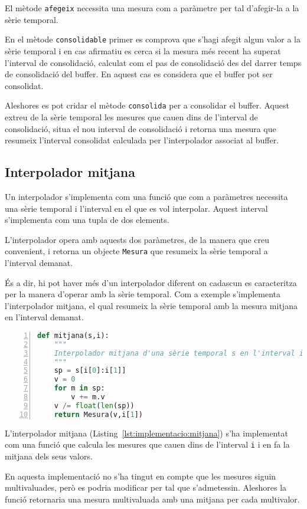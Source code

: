El mètode \verb+afegeix+ necessita una mesura com a paràmetre per tal d'afegir-la a la sèrie temporal.

En el mètode \verb+consolidable+ primer es comprova que s'hagi afegit algun valor a la sèrie temporal i en cas afirmatiu es cerca si la mesura més recent ha superat l'interval de consolidació, calculat com el pas de consolidació des del darrer temps de consolidació del buffer. En aquest cas es considera que el buffer pot ser consolidat.

Aleshores es pot cridar el mètode \verb+consolida+ per a consolidar el buffer. Aquest extreu de la sèrie temporal les mesures que cauen dins de l'interval de consolidació, situa el nou interval de consolidació i retorna una mesura que resumeix l'interval consolidat calculada per l'interpolador associat al buffer.


\subsection{Interpolador mitjana}

Un interpolador s'implementa com una funció que com a paràmetres necessita una sèrie temporal i l'interval en el que es vol interpolar. Aquest interval s'implementa com una tupla de dos elements. 

L'interpolador opera amb aquests dos paràmetres, de la manera que creu convenient, i retorna un objecte \verb+Mesura+ que resumeix la sèrie temporal a l'interval demanat.

És a dir, hi pot haver més d'un interpolador diferent on cadascun es caracteritza per la manera d'operar amb la sèrie temporal. Com a exemple s'implementa l'interpolador mitjana, el qual resumeix la sèrie temporal amb la mesura mitjana en l'interval demanat.

\begin{lstlisting}[float,language=Python,caption=Implementació de l'interpolador mitjana,label=lst:implementacio:mitjana,numbers=left]
def mitjana(s,i):
    """
    Interpolador mitjana d'una sèrie temporal s en l'interval i.
    """
    sp = s[i[0]:i[1]]
    v = 0
    for m in sp:
        v += m.v 
    v /= float(len(sp))
    return Mesura(v,i[1])
\end{lstlisting}

L'interpolador mitjana (Listing~\ref{lst:implementacio:mitjana}) s'ha implementat com una funció que calcula les mesures que cauen dins de l'interval \verb+i+ i en fa la mitjana dels seus valors. 

En aquesta implementació no s'ha tingut en compte que les mesures siguin multivaluades, però es podria modificar per tal que s'admetessin. Aleshores la funció retornaria una mesura multivaluada amb una mitjana per cada multivalor.



